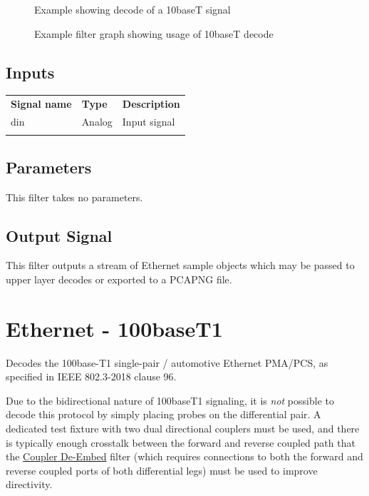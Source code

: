\begin{figure}[h]
\centering
{}
\caption{Example showing decode of a 10baseT signal}
\label{filter_10baset}
\end{figure}

\begin{figure}[h]
\centering
{}
\caption{Example filter graph showing usage of 10baseT decode}
\label{filter_graph_10baset}
\end{figure}

\FloatBarrier
\subsection{Inputs}

\begin{tabularx}{16cm}{llX}
\thickhline
\textbf{Signal name} & \textbf{Type} & \textbf{Description} \\
\thickhline
din & Analog & Input signal\\
\thickhline
\end{tabularx}

\subsection{Parameters}

This filter takes no parameters.

\subsection{Output Signal}

This filter outputs a stream of Ethernet sample objects which may be passed to upper layer decodes or exported to a
PCAPNG file.

\pagebreak
\section{Ethernet - 100baseT1}
\label{filter:100baset1}

Decodes the 100base-T1 single-pair / automotive Ethernet PMA/PCS, as specified in IEEE 802.3-2018 clause 96.

Due to the bidirectional nature of 100baseT1 signaling, it is \emph{not} possible to decode this protocol by simply
placing probes on the differential pair. A dedicated test fixture with two dual directional couplers must be used, and
there is typically enough crosstalk between the forward and reverse coupled path that the
\hyperref[filter:couplerdbed]{Coupler De-Embed} filter (which requires connections to both the forward and reverse
coupled ports of both differential legs) must be used to improve directivity.

